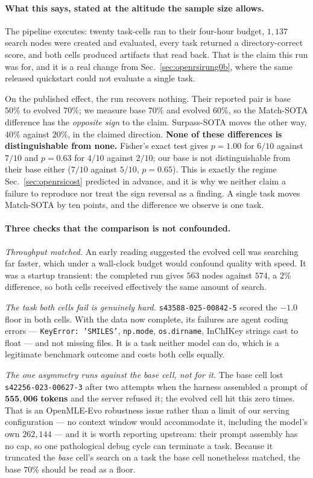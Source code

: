 \paragraph{What this says, stated at the altitude the sample size allows.}
The pipeline executes: twenty task-cells ran to their four-hour budget, $1{,}137$ search nodes
were created and evaluated, every task returned a directory-correct score, and both cells
produced artifacts that read back. That is the claim this run was for, and it is a real change
from Sec.~\ref{sec:openrsirung0b}, where the same released quickstart could not evaluate a
single task.

On the published effect, the run recovers nothing. Their reported pair is base $50\%$ to
evolved $70\%$; we measure base $70\%$ and evolved $60\%$, so the Match-SOTA difference has
the \emph{opposite sign} to the claim. Surpass-SOTA moves the other way, $40\%$ against
$20\%$, in the claimed direction. \textbf{None of these differences is distinguishable from
none.} Fisher's exact test gives $p = 1.00$ for $6/10$ against $7/10$ and $p = 0.63$ for
$4/10$ against $2/10$; our base is not distinguishable from their base either ($7/10$ against
$5/10$, $p = 0.65$). This is exactly the regime Sec.~\ref{sec:openrsicost} predicted in
advance, and it is why we neither claim a failure to reproduce nor treat the sign reversal as
a finding. A single task moves Match-SOTA by ten points, and the difference we observe is one
task.

\paragraph{Three checks that the comparison is not confounded.}
\emph{Throughput matched.} An early reading suggested the evolved cell was searching far
faster, which under a wall-clock budget would confound quality with speed. It was a startup
transient: the completed run gives $563$ nodes against $574$, a $2\%$ difference, so both
cells received effectively the same amount of search.

\emph{The task both cells fail is genuinely hard.} \texttt{s43588-025-00842-5} scored the
$-1.0$ floor in both cells. With the data now complete, its failures are agent coding errors
--- \texttt{KeyError: 'SMILES'}, \texttt{np.mode}, \texttt{os.dirname}, InChIKey strings cast
to float --- and not missing files. It is a task neither model can do, which is a legitimate
benchmark outcome and costs both cells equally.

\emph{The one asymmetry runs against the base cell, not for it.} The base cell lost
\texttt{s42256-023-00627-3} after two attempts when the harness assembled a prompt of
$\mathbf{555{,}006}$ \textbf{tokens} and the server refused it; the evolved cell hit this zero
times. That is an OpenMLE-Evo robustness issue rather than a limit of our serving
configuration --- no context window would accommodate it, including the model's own $262{,}144$
--- and it is worth reporting upstream: their prompt assembly has no cap, so one pathological
debug cycle can terminate a task. Because it truncated the \emph{base} cell's search on a task
the base cell nonetheless matched, the base $70\%$ should be read as a floor.


